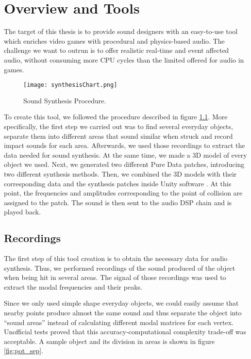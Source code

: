 \chapter{Overview and Tools}\label{ch:method}
The target of this thesis is to provide sound designers with an easy-to-use tool which enriches video games with procedural and physics-based audio. The challenge we want to outrun is to offer realistic real-time and event affected audio, without consuming more CPU cycles than the limited offered for audio in games.

\begin{figure}[H]
  \centering
    \texttt{[image: synthesisChart.png]}
      \caption{Sound Synthesis Procedure.}
      \label{fig:synth_proc}
\end{figure}

To create this tool, we followed the procedure described in figure \ref{fig:synth_proc}. More specifically, the first step we carried out was to find several everyday objects, separate them into different areas that sound similar when struck and record impact sounds for each area. Afterwards, we used those recordings to extract the data needed for sound synthesis. At the same time, we made a 3D model of every object we used. Next, we generated two different Pure Data patches, introducing two different synthesis methods. Then, we combined the 3D models with their corresponding data and the synthesis patches inside Unity\textsuperscript{\textregistered} software \cite{bib:unity}. At this point, the frequencies and amplitudes corresponding to the point of collision are assigned to the patch. The sound is then sent to the audio DSP chain and is played back. 

\section{Recordings}
The first step of this tool creation is to obtain the necessary data for audio synthesis. Thus, we performed recordings of the sound produced of the object when being hit in several areas. The signal of those recordings was used to extract the modal frequencies and their peaks. 

Since we only used simple shape everyday objects, we could easily assume that nearby points produce almost the same sound and thus separate the object into ``sound areas'' instead of calculating different modal matrices for each vertex. Unofficial tests proved that this accuracy-computational complexity trade-off was acceptable. A sample object and its division in areas is shown in figure \ref{fig:pot_sep}.

